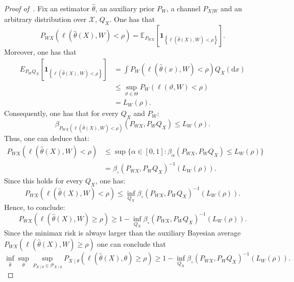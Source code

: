 \documentclass[11pt]{article}
\theoremstyle{definition}
\theoremstyle{remark}
\newcommand{\1}{\boldsymbol{1}}
\begin{document}
\begin{proof}[Proof of~]
Fix an estimator $\widehat \theta$, an auxiliary prior $P_W$, a channel $P_{X|W}$ and an arbitrary distribution over $\mathcal X$, $Q_X$. 
One has that
\begin{equation}
    P_{WX}(\ell(\widehat \theta(X),W)<\rho) = \mathbb E_{P_{WX}}\left[\1_{\left\{\ell(\widehat \theta(X),W)<\rho\right\}}\right].
\end{equation}
Moreover, one has that
\begin{align}
    E_{P_WQ_X}\left[\1_{\left\{\ell(\widehat \theta(X),W)<\rho\right\}}\right] &= \int P_{W}(\ell(\widehat \theta(x),W)<\rho) Q_X(\mathrm dx)\\
    &\leq \sup_{\vartheta \in \Theta} P_{W}(\ell(\vartheta,W)<\rho) \\
    &= L_W(\rho).
\end{align}
Consequently, one has that for every $Q_X$ and $P_W$:
\begin{equation}
    \beta_{P_{WX}(\ell(\widehat \theta(X),W)<\rho)}(P_{WX},P_WQ_X) \leq L_W(\rho).
\end{equation}
Thus, one can deduce that:
\begin{align}
    P_{WX}(\ell(\widehat \theta(X),W)<\rho) &\leq \sup\{ \alpha \in [0,1]: \beta_\alpha(P_{WX},P_WQ_X)\leq L_W(\rho)\}\\ &= \beta_{\circ}(P_{WX},P_WQ_X)^{-1}(L_W(\rho)).
\end{align}
Since this holds for every $Q_X$, one has:
\begin{equation}
    P_{WX}(\ell(\widehat \theta(X),W)<\rho) \leq \inf_{Q_X}\beta_{\circ}(P_{WX},P_WQ_X)^{-1}(L_W(\rho)).
\end{equation}
Hence, to conclude:
\begin{equation}
    P_{WX}(\ell(\widehat \theta(X),W)\geq \rho) \geq 1-\inf_{Q_X}\beta_{\circ}(P_{WX},P_WQ_X)^{-1}(L_W(\rho)).
\end{equation}
Since the minimax risk is always larger than the auxiliary Bayesian average $P_{WX}(\ell(\widehat \theta(X),W)\geq \rho)$ one can conclude that
\begin{equation}
\inf_{\widehat\theta}
\sup_{\theta}
\sup_{P_{X\mid\theta}\in\mathscr P_{X\mid\theta}}
P_{X\mid\theta}
\left(\ell(\widehat\theta(X),\theta)\ge\rho\right)
\ge
1-\inf_{Q_X}\beta_{\circ}(P_{WX},P_WQ_X)^{-1}(L_W(\rho)).
\end{equation}
\end{proof}
\end{document}
